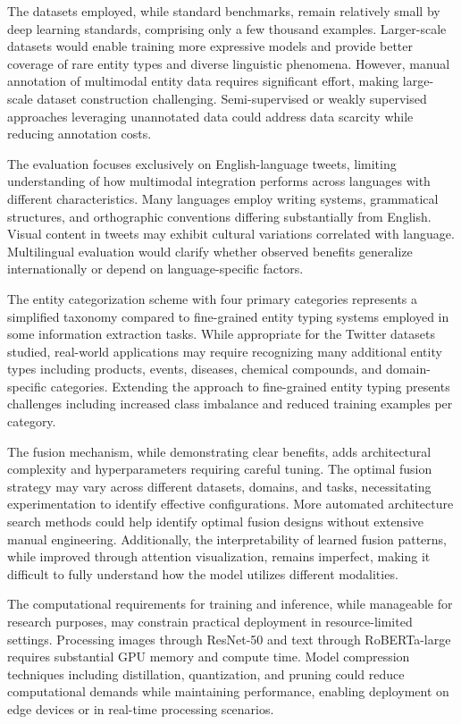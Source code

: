 \documentclass[12pt,a4paper]{report}
\begin{document}
The datasets employed, while standard benchmarks, remain relatively small by deep learning standards, comprising only a few thousand examples. Larger-scale datasets would enable training more expressive models and provide better coverage of rare entity types and diverse linguistic phenomena. However, manual annotation of multimodal entity data requires significant effort, making large-scale dataset construction challenging. Semi-supervised or weakly supervised approaches leveraging unannotated data could address data scarcity while reducing annotation costs.

The evaluation focuses exclusively on English-language tweets, limiting understanding of how multimodal integration performs across languages with different characteristics. Many languages employ writing systems, grammatical structures, and orthographic conventions differing substantially from English. Visual content in tweets may exhibit cultural variations correlated with language. Multilingual evaluation would clarify whether observed benefits generalize internationally or depend on language-specific factors.

The entity categorization scheme with four primary categories represents a simplified taxonomy compared to fine-grained entity typing systems employed in some information extraction tasks. While appropriate for the Twitter datasets studied, real-world applications may require recognizing many additional entity types including products, events, diseases, chemical compounds, and domain-specific categories. Extending the approach to fine-grained entity typing presents challenges including increased class imbalance and reduced training examples per category.

The fusion mechanism, while demonstrating clear benefits, adds architectural complexity and hyperparameters requiring careful tuning. The optimal fusion strategy may vary across different datasets, domains, and tasks, necessitating experimentation to identify effective configurations. More automated architecture search methods could help identify optimal fusion designs without extensive manual engineering. Additionally, the interpretability of learned fusion patterns, while improved through attention visualization, remains imperfect, making it difficult to fully understand how the model utilizes different modalities.

The computational requirements for training and inference, while manageable for research purposes, may constrain practical deployment in resource-limited settings. Processing images through ResNet-50 and text through RoBERTa-large requires substantial GPU memory and compute time. Model compression techniques including distillation, quantization, and pruning could reduce computational demands while maintaining performance, enabling deployment on edge devices or in real-time processing scenarios.
\end{document}
